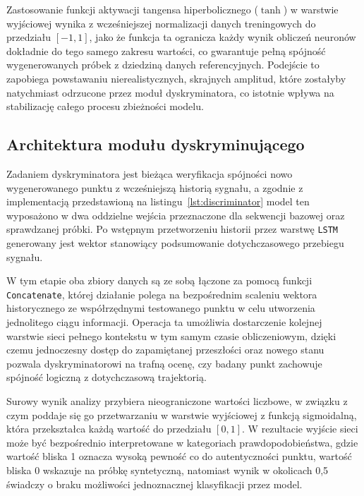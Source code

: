 Zastosowanie funkcji aktywacji tangensa hiperbolicznego ($\tanh$) w warstwie wyjściowej wynika z wcześniejszej normalizacji danych treningowych do przedziału $[-1, 1]$, jako że funkcja ta ogranicza każdy wynik obliczeń neuronów dokładnie do tego samego zakresu wartości, co gwarantuje pełną spójność wygenerowanych próbek z dziedziną danych referencyjnych. Podejście to zapobiega powstawaniu nierealistycznych, skrajnych amplitud, które zostałyby natychmiast odrzucone przez moduł dyskryminatora, co istotnie wpływa na stabilizację całego procesu zbieżności modelu.
 

 
\subsection{Architektura modułu dyskryminującego}
 
Zadaniem dyskryminatora jest bieżąca weryfikacja spójności nowo wygenerowanego punktu z wcześniejszą historią sygnału, a zgodnie z implementacją przedstawioną na listingu~\ref{lst:discriminator} model ten wyposażono w dwa oddzielne wejścia przeznaczone dla sekwencji bazowej oraz sprawdzanej próbki. Po wstępnym przetworzeniu historii przez warstwę \texttt{LSTM} generowany jest wektor stanowiący podsumowanie dotychczasowego przebiegu sygnału.
 
W tym etapie oba zbiory danych są ze sobą łączone za pomocą funkcji \texttt{Concatenate}, której działanie polega na bezpośrednim scaleniu wektora historycznego ze współrzędnymi testowanego punktu w celu utworzenia jednolitego ciągu informacji. Operacja ta umożliwia dostarczenie kolejnej warstwie sieci pełnego kontekstu w tym samym czasie obliczeniowym, dzięki czemu jednoczesny dostęp do zapamiętanej przeszłości oraz nowego stanu pozwala dyskryminatorowi na trafną ocenę, czy badany punkt zachowuje spójność logiczną z dotychczasową trajektorią.
 
Surowy wynik analizy przybiera nieograniczone wartości liczbowe, w związku z czym poddaje się go przetwarzaniu w warstwie wyjściowej z funkcją sigmoidalną, która przekształca każdą wartość do przedziału $[0, 1]$. W rezultacie wyjście sieci może być bezpośrednio interpretowane w kategoriach prawdopodobieństwa, gdzie wartość bliska 1 oznacza wysoką pewność co do autentyczności punktu, wartość bliska 0 wskazuje na próbkę syntetyczną, natomiast wynik w okolicach 0,5 świadczy o braku możliwości jednoznacznej klasyfikacji przez model.
 
